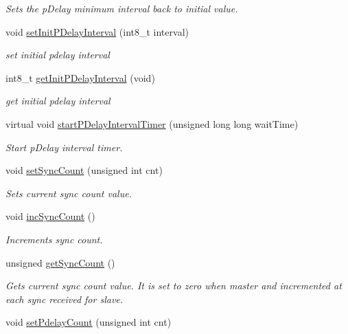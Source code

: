 \begin{DoxyCompactItemize}
\begin{DoxyCompactList}\small\item\em Sets the p\+Delay minimum interval back to initial value. \end{DoxyCompactList}\item 
void \hyperlink{class_common_port_ae85afbc79e2236958fd975d9bd55d61e}{set\+Init\+P\+Delay\+Interval} (int8\+\_\+t interval)
\begin{DoxyCompactList}\small\item\em set initial pdelay interval \end{DoxyCompactList}\item 
int8\+\_\+t \hyperlink{class_common_port_ad2164f9dd75bd80b8e8dd7456f6c5dc3}{get\+Init\+P\+Delay\+Interval} (void)
\begin{DoxyCompactList}\small\item\em get initial pdelay interval \end{DoxyCompactList}\item 
virtual void \hyperlink{class_common_port_a6fb0ad2d83f335ad766394adfd52e930}{start\+P\+Delay\+Interval\+Timer} (unsigned long long wait\+Time)
\begin{DoxyCompactList}\small\item\em Start p\+Delay interval timer. \end{DoxyCompactList}\item 
void \hyperlink{class_common_port_af6ea2ac59598ee23d3886aa4a98ad4ab}{set\+Sync\+Count} (unsigned int cnt)
\begin{DoxyCompactList}\small\item\em Sets current sync count value. \end{DoxyCompactList}\item 
void \hyperlink{class_common_port_adc84a20b20a67b0e1bb87313c7e923fd}{inc\+Sync\+Count} ()
\begin{DoxyCompactList}\small\item\em Increments sync count. \end{DoxyCompactList}\item 
unsigned \hyperlink{class_common_port_ae83aa3b2d155e97810ccccd57e9f13ca}{get\+Sync\+Count} ()
\begin{DoxyCompactList}\small\item\em Gets current sync count value. It is set to zero when master and incremented at each sync received for slave. \end{DoxyCompactList}\item 
void \hyperlink{class_common_port_aec03e751f24fcab6ae26789a1ae727ac}{set\+Pdelay\+Count} (unsigned int cnt)

\end{DoxyCompactItemize}
